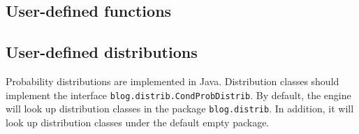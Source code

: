 \subsection{User-defined functions}\label{user-defined-function-section}



\subsection{User-defined distributions}\label{user-defined-distribution-section}

Probability distributions are implemented in Java.  Distribution classes should implement the interface \verb|blog.distrib.CondProbDistrib|. 
By default, the \bl engine will look up distribution classes in the package \verb|blog.distrib|. In addition, it will look up distribution classes under the default empty package. 

